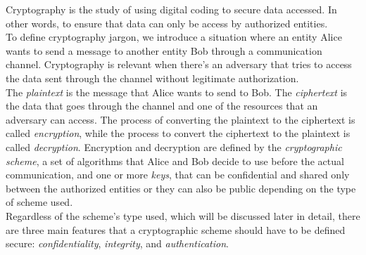 Cryptography is the study of using digital coding to secure data accessed. In other words, to ensure that data can only be access by authorized entities.\\
To define cryptography jargon, we introduce a situation where an entity Alice wants to send a message to another entity Bob through a communication channel. Cryptography is relevant when there's an adversary that tries to access the data sent through the channel without legitimate authorization.\\
The \emph{plaintext} is the message that Alice wants to send to Bob. The \emph{ciphertext} is the data that goes through the channel and one of the resources that an adversary can access.
The process of converting the plaintext to the ciphertext is called \emph{encryption}, while the process to convert the ciphertext to the plaintext is called \emph{decryption}.
Encryption and decryption are defined by the \emph{cryptographic scheme}, a set of algorithms that Alice and Bob decide to use before the actual communication, and one or more \emph{keys}, that can be confidential and shared only between the authorized entities or they can also be public depending on the type of scheme used.\\
Regardless of the scheme's type used, which will be discussed later in detail, there are three main features that a cryptographic scheme should have to be defined secure: \emph{confidentiality}, \emph{integrity}, and \emph{authentication}.
